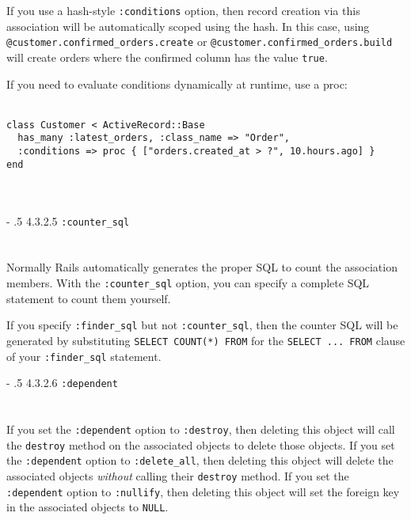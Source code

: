 \documentclass[10pt]{book}
\makeatletter
\renewcommand\paragraph{%
   \@startsection{paragraph}{4}{0mm}%
      {-\baselineskip}%
      {.5\baselineskip}%
      {\normalfont\scriptsize\bfseries}}
\makeatother
\begin{document}
If you use a hash-style \texttt{:conditions} option, then record creation via this association will be automatically scoped using the hash. In this case, using \texttt{@customer.confirmed\_orders.create} or \texttt{@customer.confirmed\_orders.build} will create orders where the confirmed column has the value \texttt{true}.

If you need to evaluate conditions dynamically at runtime, use a proc:
\\ \\
\begin{minipage}{\textwidth}{\scriptsize
\begin{verbatim}
class Customer < ActiveRecord::Base
  has_many :latest_orders, :class_name => "Order",
  :conditions => proc { ["orders.created_at > ?", 10.hours.ago] }
end
\end{verbatim}}
\end{minipage}
\\ \\

\paragraph{4.3.2.5 \texttt{:counter\_sql}}\\ \\\\

Normally Rails automatically generates the proper SQL to count the association members. With the \texttt{:counter\_sql} option, you can specify a complete SQL statement to count them yourself.

If you specify \texttt{:finder\_sql} but not \texttt{:counter\_sql}, then the counter SQL will be generated by substituting \texttt{SELECT COUNT(*) FROM} for the \texttt{SELECT ... FROM} clause of your \texttt{:finder\_sql} statement.

\paragraph{4.3.2.6 \texttt{:dependent}}\\ \\\\

If you set the \texttt{:dependent} option to \texttt{:destroy}, then deleting this object will call the \texttt{destroy} method on the associated objects to delete those objects. If you set the \texttt{:dependent} option to \texttt{:delete\_all}, then deleting this object will delete the associated objects \emph{without} calling their \texttt{destroy} method. If you set the \texttt{:dependent} option to \texttt{:nullify}, then deleting this object will set the foreign key in the associated objects to \texttt{NULL}.
\end{document}
